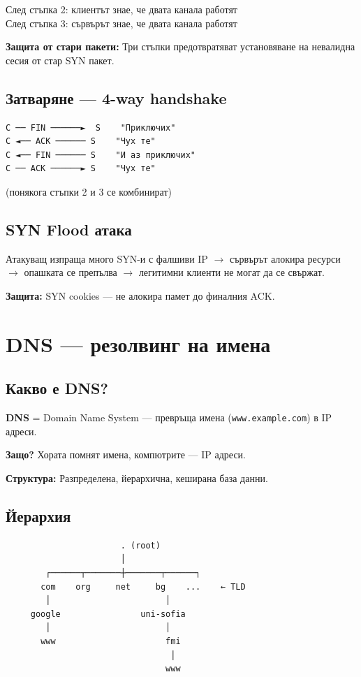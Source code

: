 \documentclass[12pt,a4paper]{article}
\begin{document}
След стъпка 2: клиентът знае, че двата канала работят\\
След стъпка 3: сървърът знае, че двата канала работят

\textbf{Защита от стари пакети:} Три стъпки предотвратяват установяване на невалидна сесия от стар SYN пакет.

\subsection{Затваряне — 4-way handshake}

\begin{lstlisting}
C ── FIN ──────►  S    "Приключих"
C ◄── ACK ────── S    "Чух те"
C ◄── FIN ────── S    "И аз приключих"
C ── ACK ──────► S    "Чух те"
\end{lstlisting}

(понякога стъпки 2 и 3 се комбинират)

\subsection{SYN Flood атака}

Атакуващ изпраща много SYN-и с фалшиви IP $\rightarrow$ сървърът алокира ресурси $\rightarrow$ опашката се препълва $\rightarrow$ легитимни клиенти не могат да се свържат.

\textbf{Защита:} SYN cookies — не алокира памет до финалния ACK.

\newpage
\section{DNS — резолвинг на имена}

\subsection{Какво е DNS?}

\textbf{DNS} = Domain Name System — превръща имена (\texttt{www.example.com}) в IP адреси.

\textbf{Защо?} Хората помнят имена, компютрите — IP адреси.

\textbf{Структура:} Разпределена, йерархична, кеширана база данни.

\subsection{Йерархия}

\begin{lstlisting}
                       . (root)
                       │
        ┌──────┬───────┼───────┬──────┐
       com    org     net     bg    ...    ← TLD
        │                       │
     google                uni-sofia
        │                       │
       www                      fmi
                                 │
                                www
\end{lstlisting}
\end{document}
